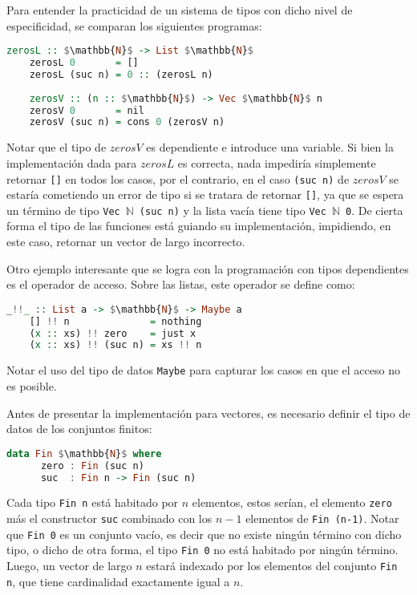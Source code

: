 Para entender la practicidad de un sistema de tipos con dicho nivel de especificidad, se comparan los siguientes programas:
\begin{lstlisting}[mathescape, language=Haskell]
	zerosL :: $\mathbb{N}$ -> List $\mathbb{N}$
	zerosL 0       = []
	zerosL (suc n) = 0 :: (zerosL n)
	
	zerosV :: (n :: $\mathbb{N}$) -> Vec $\mathbb{N}$ n
	zerosV 0       = nil
	zerosV (suc n) = cons 0 (zerosV n)
\end{lstlisting}

Notar que el tipo de $zerosV$ es dependiente e introduce una variable.
Si bien la implementación dada para $zerosL$ es correcta, nada impediría simplemente retornar \verb|[]| en todos los casos, por el contrario, en el caso \verb|(suc n)| de $zerosV$ se estaría cometiendo un error de tipo si se tratara de retornar \verb|[]|, ya que se espera un término de tipo \verb|Vec|~$\mathbb{N}$~\verb|(suc n)| y la lista vacía tiene tipo \verb|Vec|~$\mathbb{N}$~\verb|0|.
De cierta forma el tipo de las funciones está guiando su implementación, impidiendo, en este caso, retornar un vector de largo incorrecto.

Otro ejemplo interesante que se logra con la programación con tipos dependientes es el operador de acceso. Sobre las listas, este operador se define como:

\begin{lstlisting}[mathescape, language=Haskell, deletekeywords={zero}]
	_!!_ :: List a -> $\mathbb{N}$ -> Maybe a
	[] !! n              = nothing
	(x :: xs) !! zero    = just x
	(x :: xs) !! (suc n) = xs !! n
\end{lstlisting}

Notar el uso del tipo de datos \verb|Maybe| para capturar los casos en que el acceso no es posible.

Antes de presentar la implementación para vectores, es necesario definir el tipo de datos de los conjuntos finitos:

\begin{lstlisting}[mathescape, language=Haskell, deletekeywords={zero}]
	data Fin $\mathbb{N}$ where
	  zero : Fin (suc n)
	  suc  : Fin n -> Fin (suc n)
\end{lstlisting}

Cada tipo \verb|Fin n| está habitado por $n$ elementos, estos serían, el elemento \verb|zero| más el constructor \verb|suc| combinado con los $n-1$ elementos de \verb|Fin (n-1)|.
Notar que \verb|Fin 0| es un conjunto vacío, es decir que no existe ningún término con dicho tipo, o dicho de otra forma, el tipo \verb|Fin 0| no está habitado por ningún término.
Luego, un vector de largo $n$ estará indexado por los elementos del conjunto \verb|Fin n|, que tiene cardinalidad exactamente igual a $n$.

